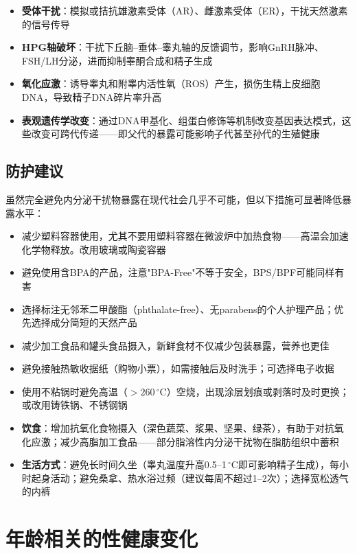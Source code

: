 \begin{itemize}[leftmargin=2cm]
	\item \textbf{受体干扰}：模拟或拮抗雄激素受体（AR）、雌激素受体（ER），干扰天然激素的信号传导
	\item \textbf{HPG轴破坏}：干扰下丘脑--垂体--睾丸轴的反馈调节，影响GnRH脉冲、FSH/LH分泌，进而抑制睾酮合成和精子生成
	\item \textbf{氧化应激}：诱导睾丸和附睾内活性氧（ROS）产生，损伤生精上皮细胞DNA，导致精子DNA碎片率升高
	\item \textbf{表观遗传学改变}：通过DNA甲基化、组蛋白修饰等机制改变基因表达模式，这些改变可跨代传递——即父代的暴露可能影响子代甚至孙代的生殖健康
\end{itemize}

\subsection{防护建议}

虽然完全避免内分泌干扰物暴露在现代社会几乎不可能，但以下措施可显著降低暴露水平：

\begin{itemize}[leftmargin=2cm]
	\item 减少塑料容器使用，尤其不要用塑料容器在微波炉中加热食物——高温会加速化学物释放。改用玻璃或陶瓷容器
	\item 避免使用含BPA的产品，注意"BPA-Free"不等于安全，BPS/BPF可能同样有害
	\item 选择标注无邻苯二甲酸酯（phthalate-free）、无parabens的个人护理产品；优先选择成分简短的天然产品
	\item 减少加工食品和罐头食品摄入，新鲜食材不仅减少包装暴露，营养也更佳
	\item 避免接触热敏收据纸（购物小票），如需接触后及时洗手；可选择电子收据
	\item 使用不粘锅时避免高温（$>260\,^\circ$C）空烧，出现涂层划痕或剥落时及时更换；或改用铸铁锅、不锈钢锅
	\item \textbf{饮食}：增加抗氧化食物摄入（深色蔬菜、浆果、坚果、绿茶），有助于对抗氧化应激；减少高脂加工食品——部分脂溶性内分泌干扰物在脂肪组织中蓄积
	\item \textbf{生活方式}：避免长时间久坐（睾丸温度升高0.5--1$\,^\circ$C即可影响精子生成），每小时起身活动；避免桑拿、热水浴过频（建议每周不超过1--2次）；选择宽松透气的内裤
\end{itemize}

\section{年龄相关的性健康变化}
